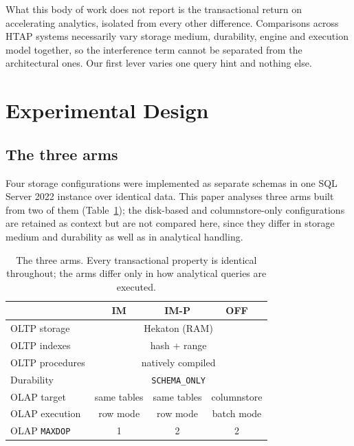 \documentclass[conference,a4paper]{IEEEtran}
\begin{document}
What this body of work does not report is the transactional return on
accelerating analytics, isolated from every other difference. Comparisons
across HTAP systems necessarily vary storage medium, durability, engine and
execution model together, so the interference term cannot be separated from the
architectural ones. Our first lever varies one query hint and nothing else.

\section{Experimental Design}

\subsection{The three arms}

Four storage configurations were implemented as separate schemas in one SQL
Server 2022 instance over identical data. This paper analyses three arms built
from two of them (Table~\ref{tab:arms}); the disk-based and columnstore-only
configurations are retained as context but are not compared here, since they
differ in storage medium and durability as well as in analytical handling.

\begin{table}[t]
\caption{The three arms. Every transactional property is identical throughout;
the arms differ only in how analytical queries are executed.}
\label{tab:arms}
\centering
\small
\begin{tabular}{@{}lccc@{}}
\toprule
 & \textbf{IM} & \textbf{IM-P} & \textbf{OFF} \\
\midrule
OLTP storage    & \multicolumn{3}{c}{Hekaton (RAM)} \\
OLTP indexes    & \multicolumn{3}{c}{hash + range} \\
OLTP procedures & \multicolumn{3}{c}{natively compiled} \\
Durability      & \multicolumn{3}{c}{\texttt{SCHEMA\_ONLY}} \\
\midrule
OLAP target     & same tables & same tables & columnstore \\
OLAP execution  & row mode    & row mode    & batch mode \\
OLAP \texttt{MAXDOP} & 1 & 2 & 2 \\
\bottomrule
\end{tabular}
\end{table}
\end{document}
